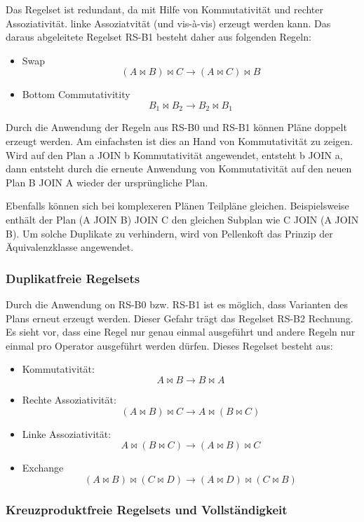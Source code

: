 Das Regelset ist redundant, da mit Hilfe von Kommutativität und rechter Assoziativität. linke Assoziatvität (und vis-à-vis) erzeugt werden kann. Das daraus abgeleitete Regelset RS-B1 besteht daher aus folgenden Regeln:

\begin{itemize}
\item Swap $$ (A \Join B) \Join C \to (A \Join C) \Join B $$
\item Bottom Commutativitity $$ B_1 \Join B_2 \to B_2 \Join B_1$$
\end{itemize}

Durch die Anwendung der Regeln aus RS-B0 und RS-B1 können Pläne doppelt erzeugt werden. Am einfachsten ist dies an Hand von Kommutativität zu zeigen. Wird auf den Plan a JOIN b Kommutativität angewendet, entsteht b JOIN a, dann entsteht durch  die erneute Anwendung von Kommutativität auf den neuen Plan B JOIN A wieder der ursprüngliche Plan.

Ebenfalls können sich bei komplexeren Plänen Teilpläne gleichen. Beispielsweise enthält der Plan (A JOIN B) JOIN C den gleichen Subplan wie C JOIN (A JOIN B). Um solche Duplikate zu verhindern, wird von Pellenkoft das Prinzip der Äquivalenzklasse  angewendet.



\subsubsection{Duplikatfreie Regelsets}
Durch die Anwendung on RS-B0 bzw. RS-B1 ist es möglich, dass Varianten des Plans erneut erzeugt werden. Dieser Gefahr trägt das Regelset RS-B2 Rechnung. Es sieht vor, dass eine Regel nur genau einmal ausgeführt und andere Regeln nur einmal pro Operator ausgeführt werden dürfen. Dieses Regelset besteht aus:


\begin{itemize}
\item Kommutativität: $$ A \Join B \to B \Join A$$
\item Rechte Assoziativität: $$(A \Join B) \Join C \to A \Join (B \Join C) $$
\item Linke Assoziativität: $$A \Join (B \Join C) \to (A \Join B) \Join C$$

\item Exchange $$(A \Join B) \Join (C \Join D) \to (A \Join D) \Join (C \Join B) $$
\end{itemize}



\subsubsection{Kreuzproduktfreie Regelsets und Vollständigkeit}

